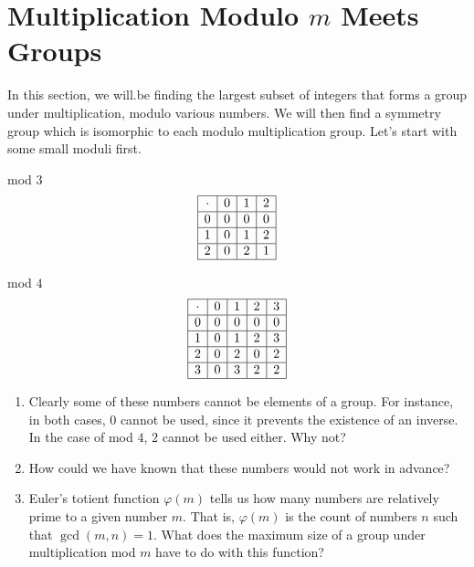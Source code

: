 \documentclass[../gatm.tex]{subfiles}
\begin{document}
\section{Multiplication Modulo $m$ Meets Groups}
\setcounter{problem_i}{0}

In this section, we will.be finding the largest subset of integers that forms a group under multiplication, modulo various numbers. We will then find a symmetry group which is isomorphic to each modulo multiplication group. Let's start with some small moduli first.

\begin{minipage}{0.5\textwidth}
\centering
mod $3$
$$\begin{array}{|c|c|c|c|}
\hline
\cdot & 0 & 1 & 2 \\ \hline
0 & 0 & 0 & 0 \\ \hline
1 & 0 & 1 & 2 \\ \hline
2 & 0 & 2 & 1 \\ \hline
\end{array}$$
\end{minipage}\hfill
\begin{minipage}{0.5\textwidth}
\centering
mod $4$
$$\begin{array}{|c|c|c|c|c|}
\hline
\cdot & 0 & 1 & 2 & 3 \\ \hline
0 & 0 & 0 & 0 & 0 \\ \hline
1 & 0 & 1 & 2 & 3 \\ \hline
2 & 0 & 2 & 0 & 2 \\ \hline
3 & 0 & 3 & 2 & 2 \\ \hline
\end{array}$$
\end{minipage}

\begin{enumerate}
\item Clearly some of these numbers cannot be elements of a group. For instance, in both cases, $0$ cannot be used, since it prevents the existence of an inverse. In the case of mod $4$, $2$ cannot be used either. Why not?
\item How could we have known that these numbers would not work in advance?
\item Euler's totient function $\varphi(m)$ tells us how many numbers are relatively prime to a given number $m$. That is, $\varphi(m)$ is the count of numbers $n$ such that $\gcd(m,n)=1$. What does the maximum size of a group under multiplication mod $m$ have to do with this function?
\setcounter{problem_i}{\value{enumi}}
\end{enumerate}
\end{document}
